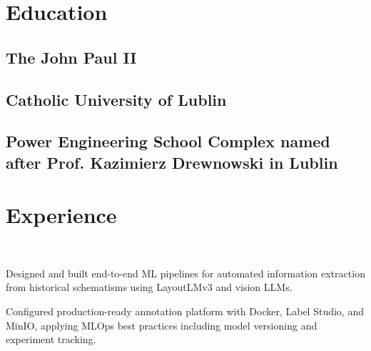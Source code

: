 \documentclass[]{deedy-resume-openfont}
\begin{document}
\hfill
\begin{minipage}[t]{0.55\textwidth} 

\section{Education} 
\subsection{The John Paul II}
\subsection{Catholic University of Lublin}
\sectionsep 

\subsection{Power Engineering School Complex named after Prof. Kazimierz Drewnowski in Lublin}
\sectionsep




\section{Experience}

 \\
\vspace{\topsep} %
\begin{tightemize}
\item Designed and built end-to-end ML pipelines for automated information extraction from historical schematisms using LayoutLMv3 and vision LLMs.
\item Configured production-ready annotation platform with Docker, Label Studio, and MinIO, applying MLOps best practices including model versioning and experiment tracking.
\end{tightemize}
\sectionsep


\end{minipage}
\end{document}
